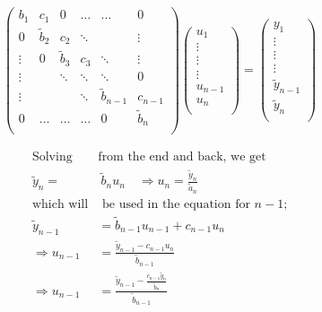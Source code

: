 \documentclass[11pt,a4paper,notitlepage]{article}
\begin{document}
\begin{minipage}{0.5\linewidth}
\begin{align*}
\left(\begin{matrix}
  b_1   & c_1    & 0      & \dots   & \dots  & 0         \\
  0   & \tilde{b}_2    & c_2    & \ddots  &        & \vdots   \\
 \vdots     & 0    & \tilde{b}_3    & c_3     & \ddots & \vdots  \\
 \vdots &        & \ddots & \ddots  & \ddots & 0       \\
 \vdots &        &        & \ddots  & \tilde{b}_{n-1} & c_{n-1}     \\
  0     & \dots  & \dots  & \dots   & 0  & \tilde{b}_n     \\
\end{matrix}\right)\left(\begin{matrix}
u_1 \\
\vdots\\
\vdots\\
\vdots\\
u_{n-1}\\
u_{n} \\
\end{matrix}\right) = \left(\begin{matrix}
y_1 \\
\vdots\\
\vdots\\
\vdots\\
\tilde{y}_{n-1}\\
\tilde{y}_{n} \\
\end{matrix}\right)
\end{align*}
\end{minipage}
\begin{minipage}{0.5\linewidth}
\begin{align*}
\text{Solving }&\text{from the end and back, we get}\\
\tilde{y}_n =&\ \tilde{b}_nu_n \quad \Rightarrow u_n = \frac{\tilde{y}_n}{\tilde{a}_n}\\
\text{which will}& \text{ be used in the equation for $n-1$;}\\
\tilde{y}_{n-1} &= \tilde{b}_{n-1}u_{n-1} + c_{n-1}u_n\\
\Rightarrow u_{n-1} &= \frac{\tilde{y}_{n-1} - c_{n-1} u_n}{ \tilde{b}_{n-1}}\\
\Rightarrow u_{n-1} &= \frac{\tilde{y}_{n-1} - \frac{c_{n-1}\tilde{y}_n}{\tilde{b}_n}}{ \tilde{b}_{n-1}}
\end{align*}
\end{minipage}
\end{document}
